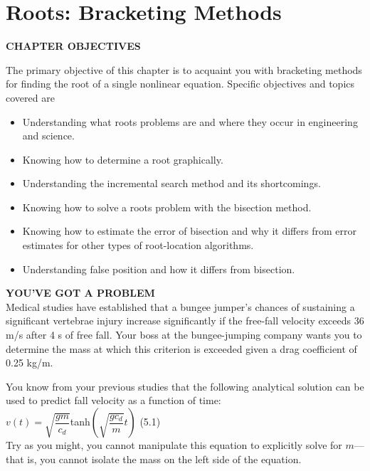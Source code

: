 \documentclass[../main.tex]{subfiles}
\begin{document}
\chapter{Roots: Bracketing Methods}
\label{chap:chap5}

\begin{center}
    \Large{\textbf{CHAPTER OBJECTIVES}}
\end{center}
The primary objective of this chapter is to acquaint you with bracketing methods for
finding the root of a single nonlinear equation. Specific objectives and topics covered are

\begin{itemize}
\item Understanding what roots problems are and where they occur in engineering and
science.
\item Knowing how to determine a root graphically.
\item Understanding the incremental search method and its shortcomings.
\item Knowing how to solve a roots problem with the bisection method.
\item Knowing how to estimate the error of bisection and why it differs from error
estimates for other types of root-location algorithms.
\item Understanding false position and how it differs from bisection.
\end{itemize}
\bigskip

\noindent\textbf{YOU'VE GOT A PROBLEM}\\

\noindent Medical studies have established that a bungee jumper's chances of sustaining a
significant vertebrae injury increase significantly if the free-fall velocity exceeds
36 m/s after 4 s of free fall. Your boss at the bungee-jumping company wants you
to determine the mass at which this criterion is exceeded given a drag coefficient of
0.25 kg/m.

You know from your previous studies that the following analytical solution can be
used to predict fall velocity as a function of time:\\

$v(t)=\sqrt{\dfrac{gm}{c_d}}$tanh$(\sqrt{\dfrac{gc_d}{m}}t)$
\hfill (5.1)\\

\noindent
Try as you might, you cannot manipulate this equation to explicitly solve for $m$---that is,
you cannot isolate the mass on the left side of the equation.
\end{document}
